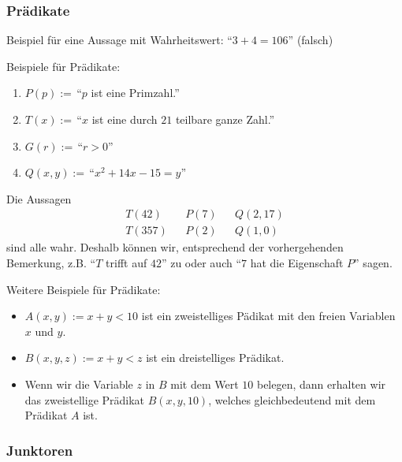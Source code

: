 \subsubsection{Prädikate}

\begin{example}
 Beispiel für eine Aussage mit Wahrheitswert: ``$3+4=106$'' (falsch)
\end{example}

\begin{example}
  Beispiele für Prädikate:
  \begin{enumerate}
  \item $P(p):= $\,``$p$ ist eine Primzahl.''
  \item $T(x):= $\,``$x$ ist eine durch $21$ teilbare ganze Zahl.''
  \item $G(r):= $\,``$r>0$''
  \item $Q(x,y):= $\,``$x^2+14x-15=y$''
  \end{enumerate}
  Die Aussagen
  \begin{align*}
  &T(42)& 	    &P(7)&		&Q(2,17)&\\
  &T(357)&  &P(2)& 	&Q(1,0)&
  \end{align*}
  sind alle wahr. Deshalb können wir, entsprechend der vorhergehenden Bemerkung, z.B. ``$T$ trifft auf $42$'' zu oder auch ``$7$ hat die Eigenschaft $P$'' sagen.
\end{example}

\begin{example}
  Weitere Beispiele für Prädikate:
  \begin{itemize}
    \item $A(x,y) := x + y < 10$ ist ein zweistelliges Pädikat mit den freien Variablen $x$ und $y$.
    \item $B(x,y,z) := x + y < z$ ist ein dreistelliges Prädikat.
    \item Wenn wir die Variable $z$ in $B$ mit dem Wert $10$ belegen, dann erhalten wir das zweistellige Prädikat $B(x,y,10)$, welches gleichbedeutend mit dem Prädikat $A$ ist.
  \end{itemize}
\end{example}

\subsubsection{Junktoren}

